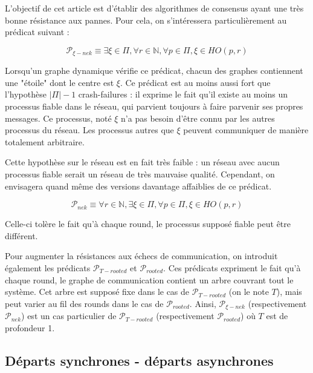 \documentclass{article}
\begin{document}
L'objectif de cet article est d'établir des algorithmes de consensus ayant une très bonne résistance aux pannes. Pour cela, on s'intéressera particulièrement au prédicat suivant :

$$\mathcal{P}_{\xi-nek} \equiv \exists \xi \in \Pi, \forall r \in \mathds{N}, \forall p \in \Pi, \xi \in HO(p,r)$$

Lorsqu'un graphe dynamique vérifie ce prédicat, chacun des graphes contiennent une "étoile" dont le centre est $\xi$.
Ce prédicat est au moins aussi fort que l'hypothèse $|\Pi| - 1$ crash-failures :
il exprime le fait qu'il existe au moins un processus fiable dans le réseau, qui parvient toujours à faire parvenir ses propres messages.
Ce processus, noté $\xi$ n'a pas besoin d'être connu par les autres processus du réseau.
Les processus autres que $\xi$ peuvent communiquer de manière totalement arbitraire.

Cette hypothèse sur le réseau est en fait très faible : un réseau avec aucun processus fiable serait un réseau de très mauvaise qualité. Cependant, on envisagera quand même des versions
davantage affaiblies de ce prédicat.

$$\mathcal{P}_{nek} \equiv \forall r \in \mathds{N}, \exists \xi \in \Pi, \forall p \in \Pi, \xi \in HO(p,r)$$

Celle-ci tolère le fait qu'à chaque round, le processus supposé fiable peut être différent.

Pour augmenter la résistances aux échecs de communication, on introduit également les prédicats $\mathcal{P}_{T-rooted}$ et $\mathcal{P}_{rooted}$.
Ces prédicats expriment le fait qu'à chaque round, le graphe de communication contient un arbre couvrant tout le système.
Cet arbre est supposé fixe dans le cas de $\mathcal{P}_{T-rooted}$ (on le note $T$), mais peut varier au fil des rounds dans le cas de $\mathcal{P}_{rooted}$.
Ainsi, $\mathcal{P}_{\xi-nek}$ (respectivement $\mathcal{P}_{nek}$) est un cas particulier de $\mathcal{P}_{T-rooted}$ (respectivement $\mathcal{P}_{rooted}$) où $T$ est de profondeur 1.

\subsection{Départs synchrones - départs asynchrones}
\end{document}

